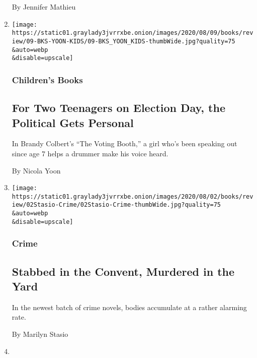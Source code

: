 \begin{enumerate}
  By Jennifer Mathieu
\item
  \href{/2020/08/01/books/review/brandy-colbert-the-voting-booth.html}{}

  \texttt{[image: https://static01.graylady3jvrrxbe.onion/images/2020/08/09/books/review/09-BKS-YOON-KIDS/09-BKS\_YOON\_KIDS-thumbWide.jpg?quality=75\\\&auto=webp\\\&disable=upscale]}

  \hypertarget{childrens-books-1}{%
  \subsubsection{Children's Books}\label{childrens-books-1}}

  \hypertarget{for-two-teenagers-on-election-day-the-political-gets-personal}{%
  \subsection{For Two Teenagers on Election Day, the Political Gets
  Personal}\label{for-two-teenagers-on-election-day-the-political-gets-personal}}

  In Brandy Colbert's ``The Voting Booth,'' a girl who's been speaking
  out since age 7 helps a drummer make his voice heard.

  By Nicola Yoon
\item
  \href{/2020/07/31/books/review/crime-fiction-megan-miranda.html}{}

  \texttt{[image: https://static01.graylady3jvrrxbe.onion/images/2020/08/02/books/review/02Stasio-Crime/02Stasio-Crime-thumbWide.jpg?quality=75\\\&auto=webp\\\&disable=upscale]}

  \hypertarget{crime}{%
  \subsubsection{Crime}\label{crime}}

  \hypertarget{stabbed-in-the-convent-murdered-in-the-yard}{%
  \subsection{Stabbed in the Convent, Murdered in the
  Yard}\label{stabbed-in-the-convent-murdered-in-the-yard}}

  In the newest batch of crime novels, bodies accumulate at a rather
  alarming rate.

  By Marilyn Stasio
\item
  \href{/2020/07/31/books/review/the-system-robert-reich-break-em-up-zephyr-teachout.html}{}


\end{enumerate}
